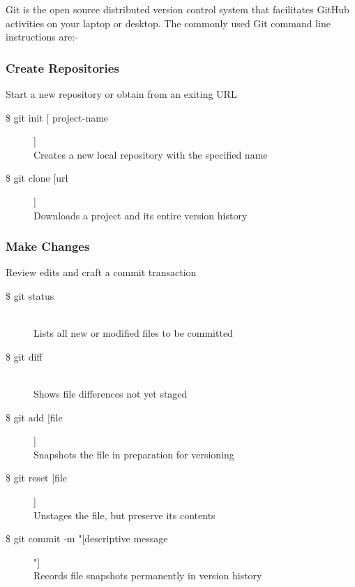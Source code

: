 Git is the open source distributed version control system that facilitates GitHub activities on your laptop or desktop. The commonly used Git command line instructions are:-\\

\subsubsection{Create Repositories}
Start a new repository or obtain from an exiting URL

\begin{description}

\item [\$ git init [ project-name]]\\
Creates a new local repository with the specified name
\item [\$ git clone [url]]\\
Downloads a project and its entire version history\\

\end{description}


\subsubsection{Make Changes}
Review edits and craft a commit transaction

\begin{description}

\item [\$ git status] \leavevmode \\
Lists all new or modified files to be committed

\item [\$ git diff] \leavevmode \\
Shows file differences not yet staged

\item [\$ git add [file]]\\
Snapshots the file in preparation for versioning

\item [\$ git reset [file]]\\
Unstages the file, but preserve its contents

\item [\$ git commit -m "[descriptive message]"]\\
Records file snapshots permanently in version history\\

\end{description}


